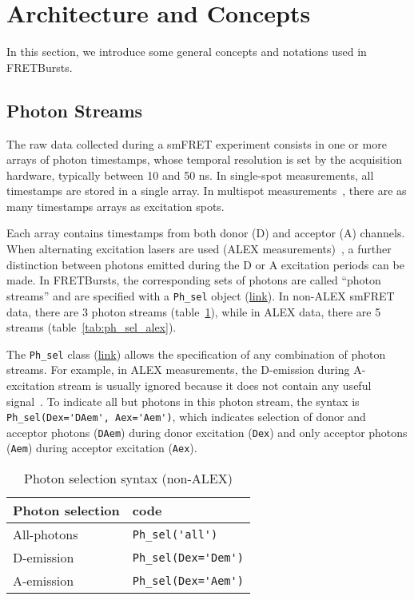 \section{Architecture and Concepts}
\label{sec:concepts}

In this section, we introduce some general concepts and notations used in FRETBursts.

\subsection{Photon Streams}
\label{sec:ph_streams}

The raw data collected during a smFRET experiment consists in one or more arrays of 
photon timestamps, whose temporal resolution is set by the acquisition hardware, 
typically between 10 and 50 ns.
In single-spot measurements, all timestamps are stored in a single array. In multispot
measurements~\cite{Ingargiola_2013}, there are as many timestamps arrays
as excitation spots.

Each array contains timestamps from both donor (D) and acceptor (A) channels.
When alternating excitation lasers are used (ALEX measurements)~\cite{Lee_2005}, 
a further distinction between photons emitted during the D or A excitation periods can be made. 
In FRETBursts, the corresponding sets of photons are called ``photon streams'' and are
specified with a \verb|Ph_sel| object
(\href{http://fretbursts.readthedocs.org/en/latest/ph_sel.html}{link}).
In non-ALEX smFRET data, there are 3 photon streams
(table~\ref{tab:ph_sel_smfret}), while in ALEX data, there are 5 streams (table~\ref{tab:ph_sel_alex}).

The \verb|Ph_sel| class (\href{http://fretbursts.readthedocs.org/en/latest/ph_sel.html}{link})
allows the specification of any combination of photon streams.
For example, in ALEX measurements, the D-emission during A-excitation stream is
usually ignored because it does not contain any useful signal~\cite{Lee_2005}.
To indicate all but photons in this photon stream, the syntax is
\verb|Ph_sel(Dex='DAem', Aex='Aem')|, which indicates selection of donor
and acceptor photons (\verb|DAem|) during donor excitation (\verb|Dex|) and only acceptor
photons (\verb|Aem|) during acceptor excitation (\verb|Aex|).

\begin{table}
\begin{tabular}{l|l}
  Photon selection  & code \\
  \hline
  All-photons       & \verb|Ph_sel('all')|\\
  D-emission    & \verb|Ph_sel(Dex='Dem')|\\
  A-emission & \verb|Ph_sel(Dex='Aem')|\\
\end{tabular}
\caption{\label{tab:ph_sel_smfret}Photon selection syntax (non-ALEX)}
\end{table}

